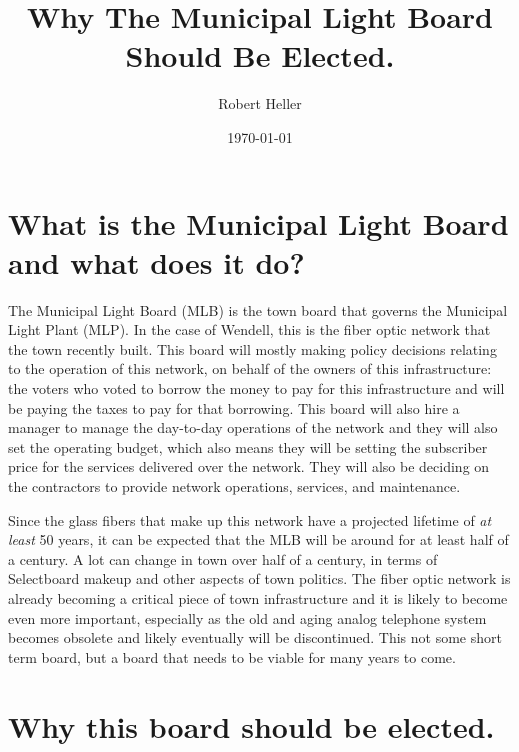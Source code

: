 \documentclass[12pt]{article}
\title{Why The Municipal Light Board Should Be Elected.}
\author{Robert Heller}
\date{\today}
\begin{document}
        
\maketitle

\tableofcontents

\section{What is the Municipal Light Board and what does it do?}

The Municipal Light Board (MLB) is the town board that governs the Municipal
Light Plant (MLP). In the case of Wendell, this is the fiber optic network
that the town recently built. This board will mostly making policy decisions
relating to the operation of this network, on behalf of the owners of this
infrastructure: the voters who voted to borrow the money to pay for this
infrastructure and will be paying the taxes to pay for that borrowing. This
board will also hire a manager to manage the day-to-day operations of the
network and they will also set the operating budget, which also means they
will be setting the subscriber price for the services delivered over the
network. They will also be deciding on the contractors to provide network 
operations, services, and maintenance.

Since the glass fibers that make up this network have a projected lifetime of
\textit{at least} 50 years, it can be expected that the MLB will be around for
at least half of a century. A lot can change in town over half of a century,
in terms of Selectboard makeup and other aspects of town politics. The fiber
optic network is already becoming a critical piece of town infrastructure and
it is likely to become even more important, especially as the old and aging
analog telephone system becomes obsolete and likely eventually will be
discontinued. This not some short term board, but a board that needs to be
viable for many years to come.

\section{Why this board should be elected.}
\end{document}
